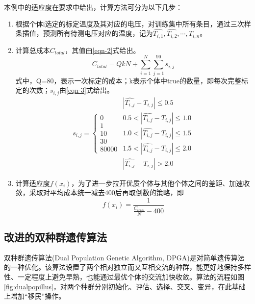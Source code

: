 \documentclass[withoutpreface,bwprint]{cumcmthesis} %
\begin{document}
本例中的适应度在要求中给出，计算方法可分为以下几步：

\begin{enumerate}
    \item 根据个体i选定的标定温度及其对应的电压，对训练集中所有条目，通过三次样条插值\cite{spline}，预测所有待测电压对应的温度，记为$\hat{T_{i,1}},\hat{T_{i,2}},\cdots,\hat{T_{i,n}}$。
    \item 计算总成本$C_{total}$，其值由\ref{eqn-2}式给出。
    \begin{equation}\label{eqn-2}
        C_{total}=QkN+\sum_{i=1}^N \sum_{j=1}^{90} s_{i,j}
    \end{equation}
    式中，Q=80，表示一次标定的成本；k表示个体中true的数量，即每次完整标定的次数；$s_{i,j}$由\ref{eqn-3}式给出。
    \begin{equation}\label{eqn-3}
    s_{i,j}=
    \left\{\begin{matrix}
    0\\
    1\\
    10\\
    30\\
    80000
    \end{matrix}\right.
    \begin{matrix}
    \left | \hat{T_{i,j}}-T_{i,j} \right | \le 0.5\\
    0.5<\left | \hat{T_{i,j}}-T_{i,j} \right | \le 1.0\\
    1.0<\left | \hat{T_{i,j}}-T_{i,j} \right | \le 1.5\\
    1.5<\left | \hat{T_{i,j}}-T_{i,j} \right | \le 2.0\\
    \left | \hat{T_{i,j}}-T_{i,j} \right | >2.0
    \end{matrix}
    \end{equation}
    \item 计算适应度$f(x_i)$，为了进一步拉开优质个体与其他个体之间的差距、加速收敛，采取对平均成本统一减去400后再取倒数的策略，即
    \begin{equation}\label{eqn-4}
        f(x_i)=\frac{1}{\frac{C_{total}}{N}-400}
    \end{equation}
\end{enumerate}

\subsection{改进的双种群遗传算法}

双种群遗传算法(Dual Population Genetic Algorithm, DPGA)\cite{dualpop}是对简单遗传算法的一种优化。该算法设置了两个相对独立而又互相交流的种群，能更好地保持多样性、一定程度上避免早熟，也能通过最优个体的交流加快收敛。算法的流程如图\ref{fig:dualpopillus}，对两个种群分别初始化、评估、选择、交叉、变异，在此基础上增加“移民”操作。
\end{document}
